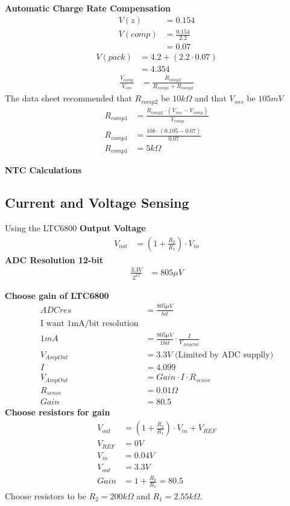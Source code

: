 \documentclass{article}
\numberwithin{figure}{section}
\numberwithin{equation}{section}
\begin{document}
{\textbf{Automatic Charge Rate Compensation}
\begin{align}
  \label{eq:comp}
  V(z) &= 0.154 \\
  V(comp) &= \frac{0.154}{2.2} \\
  &= 0.07
\end{align}
\begin{align}
  \label{eq:comp2}
  V(pack) &= 4.2 + (2.2 \cdot 0.07)\\
  &= 4.354
\end{align}
\begin{align}
  \label{eq:comp3}
  \frac{V_{comp}}{V_{sns}} &= \frac{R_{comp2}}{R_{comp1}+R_{comp2}}
\end{align}
The data sheet recommended that $R_{comp2}$ be $10k\Omega$ and that $V_{sns}$ be $105mV$
\begin{align}
  \label{eq:rcomps}
  R_{comp1}&=\frac{R_{comp2} \cdot \left(V_{sns}-V_{comp}\right)}{V_{comp}} \\
  R_{comp1}&=\frac{10k \cdot (0.105 - 0.07)}{0.07} \\
  R_{comp1}&=5k\Omega
\end{align}

\textbf{NTC Calculations}

\subsection{Current and Voltage Sensing}\label{app:cvsense}
Using the LTC6800
\textbf{Output Voltage}
\begin{align}
  \label{eq:vout}
  V_{out} &= \left(1+\frac{R_2}{R_1}\right)\cdot V_{in}
\end{align}
\textbf{ADC Resolution 12-bit}
\begin{align}
  \label{eq:adcres}
  \frac{3.3V}{2^{12}} &= 805\mu V
\end{align}

\textbf{Choose gain of LTC6800}
\begin{align}
  \label{eq:asense}
  ADCres &= \frac{805\mu V}{bit} \\
  \mbox{I want 1mA/bit resolution} \\
  1mA &= \frac{805\mu V}{1bit} \cdot \frac{I}{V_{AmpOut}} \\
  V_{AmpOut} &= 3.3V \mbox{ (Limited by ADC supplly)} \\
  I &= 4.099 \\
  V_{AmpOut} &= Gain \cdot I \cdot R_{sense} \\
  R_{sense} &= 0.01 \Omega \\
  Gain &= 80.5
\end{align}
\textbf{Choose resistors for gain}
\begin{align}
  \label{eq:gainresistors}
  V_{out} &= \left(1+\frac{R_2}{R_1}\right)\cdot V_{in} + V_{REF} \\
  V_{REF} &= 0V \\
  V_{in} &= 0.04V \\
  V_{out} &= 3.3V \\
  Gain &= 1+\frac{R_2}{R_1} = 80.5
\end{align}
Choose resistors to be $R_2=200k\Omega$ and $R_1=2.55k\Omega$. 

}
\end{document}
